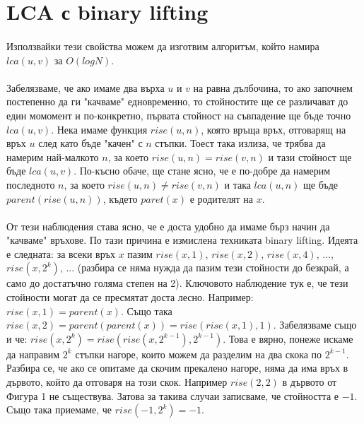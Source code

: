 \documentclass[12pt]{article}
\begin{document}
\section*{LCA с binary lifting}
\paragraph*{}
Използвайки тези свойства можем да изготвим алгоритъм, който намира $lca(u, v)$ за $O(logN)$. 
\paragraph*{}
Забелязваме, че ако имаме два върха $u$ и $v$ на равна дълбочина, то ако започнем постепенно да ги "качваме" едновременно, то стойностите ще се различават до един момомент и по-конкретно, първата стойност на съвпадение ще бъде точно $lca(u, v)$. Нека имаме функция $rise(u, n)$, която връща връх, отговарящ на връх $u$ след като бъде "качен" с $n$ стъпки. Тоест така излиза, че трябва да намерим най-малкото $n$, за което $rise(u, n) = rise(v, n)$ и тази стойност ще бъде $lca(u, v)$. По-късно обаче, ще стане ясно, че е по-добре да намерим последното $n$, за което $rise(u, n) \neq rise(v, n)$ и така $lca(u, n)$ ще бъде $parent(rise(u, n))$, където $paret(x)$ е родителят на $x$.
\paragraph*{}
От тези наблюдения става ясно, че е доста удобно да имаме бърз начин да "качваме" връхове. По тази причина е измислена техниката binary lifting. Идеята е следната: за всеки връх $x$ пазим $rise(x, 1)$, $rise(x, 2)$, $rise(x, 4)$, ..., $rise(x, 2^k)$, ... (разбира се няма нужда да пазим тези стойности до безкрай, а само до достатъчно голяма степен на 2). Ключовото наблюдение тук е, че тези стойности могат да се пресмятат доста лесно. Например: $rise(x, 1) = parent(x)$. Също така $rise(x, 2) = parent(parent(x)) = rise(rise(x, 1), 1)$. Забелязваме също и че: $rise(x, 2^k) = rise(rise(x, 2^{k-1}), 2^{k-1})$. Това е вярно, понеже искаме да направим $2^k$ стъпки нагоре, които можем да разделим на два скока по $2^{k-1}$. Разбира се, че ако се опитаме да скочим прекалено нагоре, няма да има връх в дървото, който да отговаря на този скок. Например $rise(2, 2)$ в дървото от Фигура 1 не съществува. Затова за такива случаи записваме, че стойността е $-1$. Също така приемаме, че $rise(-1, 2^k) = -1$.  
\end{document}
